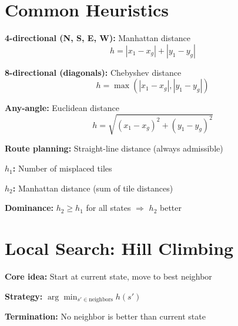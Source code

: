 \documentclass[11pt,a4paper]{article}
\begin{document}
\section{Common Heuristics}

\begin{definitionbox}
\textbf{4-directional (N, S, E, W):} Manhattan distance
\[h = |x_1 - x_g| + |y_1 - y_g|\]

\textbf{8-directional (diagonals):} Chebyshev distance
\[h = \max(|x_1 - x_g|, |y_1 - y_g|)\]

\textbf{Any-angle:} Euclidean distance
\[h = \sqrt{(x_1 - x_g)^2 + (y_1 - y_g)^2}\]

\textbf{Route planning:} Straight-line distance (always admissible)
\end{definitionbox}

\begin{definitionbox}
\textbf{$h_1$:} Number of misplaced tiles

\textbf{$h_2$:} Manhattan distance (sum of tile distances)

\textbf{Dominance:} $h_2 \geq h_1$ for all states $\Rightarrow$ $h_2$ better
\end{definitionbox}

\section{Local Search: Hill Climbing}

\begin{definitionbox}
\textbf{Core idea:} Start at current state, move to best neighbor

\textbf{Strategy:} $\arg\min_{s' \in \text{neighbors}} h(s')$

\textbf{Termination:} No neighbor is better than current state
\end{definitionbox}
\end{document}
